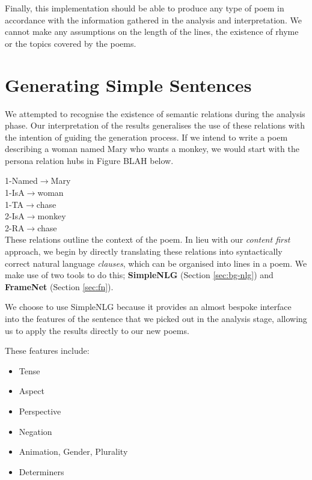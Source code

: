 Finally, this implementation should be able to produce any type of poem in accordance with the information gathered in the analysis and interpretation. We cannot make any assumptions on the length of the lines, the existence of rhyme or the topics covered by the poems.


\section{Generating Simple Sentences}
\label{sec:build}
We attempted to recognise the existence of semantic relations during the analysis phase. Our interpretation of the results generalises the use of these relations with the intention of guiding the generation process. If we intend to write a poem describing a woman named Mary who wants a monkey, we would start with the persona relation hubs in Figure BLAH below.

1-Named$\rightarrow$Mary\\
1-IsA$\rightarrow$woman\\
1-TA$\rightarrow$chase\\
2-IsA$\rightarrow$monkey\\
2-RA$\rightarrow$chase\\

These relations outline the context of the poem. In lieu with our \textit{content first} approach, we begin by directly translating these relations into syntactically correct natural language \textit{clauses}, which can be organised into lines in a poem. We make use of two tools to do this; \textbf{SimpleNLG} (Section \ref{sec:bg-nlg}) and \textbf{FrameNet} (Section \ref{sec:fn}).

We choose to use SimpleNLG because it provides an almost bespoke interface into the features of the sentence that we picked out in the analysis stage, allowing us to apply the results directly to our new poems.

These features include:
\begin{itemize}
\item{Tense}
\item{Aspect}
\item{Perspective}
\item{Negation}
\item{Animation, Gender, Plurality}
\item{Determiners}
\end{itemize}

